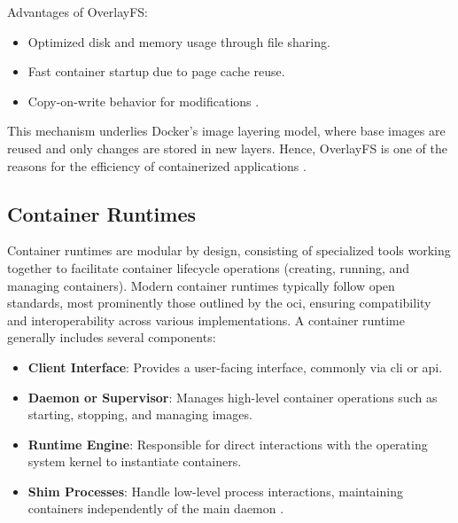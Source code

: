Advantages of OverlayFS:
\begin{itemize}
    \item Optimized disk and memory usage through file sharing.
    \item Fast container startup due to page cache reuse.
    \item Copy-on-write behavior for modifications \citep{jainLinuxContainersVirtualization2023}.
\end{itemize}
This mechanism underlies Docker's image layering model, where base images are reused and only changes are stored in new layers.
Hence, OverlayFS is one of the reasons for the efficiency of containerized applications \citep{jainLinuxContainersVirtualization2023}.


\subsection{Container Runtimes}
Container runtimes are modular by design, consisting of specialized tools working together to facilitate container lifecycle operations (creating, running, and managing containers).
Modern container runtimes typically follow open standards, most prominently those outlined by the \ac{oci}, ensuring compatibility and interoperability across various implementations.
A container runtime generally includes several components:
\begin{itemize}
    \item \textbf{Client Interface}: Provides a user-facing interface, commonly via \ac{cli} or \ac{api}.
    \item \textbf{Daemon or Supervisor}: Manages high-level container operations such as starting, stopping, and managing images.
    \item \textbf{Runtime Engine}: Responsible for direct interactions with the operating system kernel to instantiate containers.
    \item \textbf{Shim Processes}: Handle low-level process interactions, maintaining containers independently of the main daemon \citep{poultonDockerDeepDive2019}.
\end{itemize}

